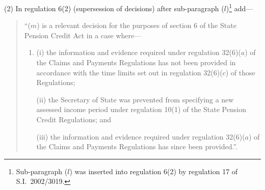 \documentclass[12pt,a4paper]{article}
\begin{document}
(2) In regulation 6(2) (supersession of decisions) after sub-paragraph ($l$)\footnote{Sub-paragraph ($l$) was inserted into regulation 6(2) by regulation 17 of S.I.\ 2002/3019.} add—
\begin{quotation}
“($m$) is a relevant decision for the purposes of section 6 of the State Pension Credit Act in a case where—
\begin{enumerate}\item[]
(i) the information and evidence required under regulation 32(6)($a$)  of the Claims and Payments Regulations has not been provided in accordance with the time limits set out in regulation 32(6)($c$)  of those Regulations;

(ii) the Secretary of State was prevented from specifying a new assessed income period under regulation 10(1) of the State Pension Credit Regulations; and

(iii) the information and evidence required under regulation 32(6)($a$)  of the Claims and Payments Regulations has since been provided.”.
\end{enumerate}
\end{quotation}
\end{document}
